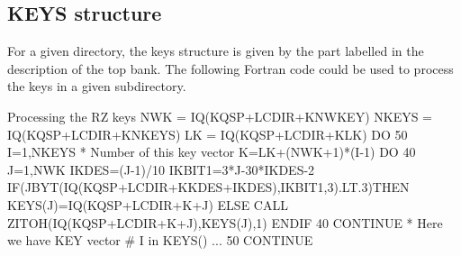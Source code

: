 \subsection*{KEYS structure}

For a given directory, the keys structure is given
by the part labelled  in the description of the top bank.
%
The following Fortran code could be used to process the keys 
in a given subdirectory.
\begin{XMPt}{Processing the RZ keys}
      NWK        = IQ(KQSP+LCDIR+KNWKEY)
      NKEYS      = IQ(KQSP+LCDIR+KNKEYS)
      LK         = IQ(KQSP+LCDIR+KLK)
      DO 50 I=1,NKEYS
*           Number of this key vector
         K=LK+(NWK+1)*(I-1)
         DO 40 J=1,NWK
            IKDES=(J-1)/10
            IKBIT1=3*J-30*IKDES-2
            IF(JBYT(IQ(KQSP+LCDIR+KKDES+IKDES),IKBIT1,3).LT.3)THEN
               KEYS(J)=IQ(KQSP+LCDIR+K+J)
            ELSE
               CALL ZITOH(IQ(KQSP+LCDIR+K+J),KEYS(J),1)
            ENDIF
  40     CONTINUE
*         Here we have KEY vector # I in KEYS()
      ...
  50  CONTINUE
\end{XMPt}
